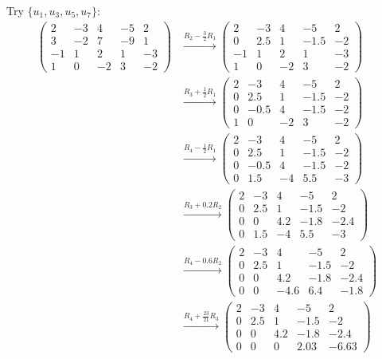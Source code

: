 \documentclass{article}
\begin{document}
Try $\{u_1, u_3, u_5, u_7\}$:
\begin{align*}
\begin{pmatrix}
2 & -3 & 4 & -5 & 2 \\
3 & -2 & 7 & -9 & 1 \\
-1 & 1 & 2 & 1 & -3 \\
1 & 0 & -2 & 3 & -2
\end{pmatrix}
&\xrightarrow{R_2 - \frac{3}{2}R_1}
\begin{pmatrix}
2 & -3 & 4 & -5 & 2 \\
0 & 2.5 & 1 & -1.5 & -2 \\
-1 & 1 & 2 & 1 & -3 \\
1 & 0 & -2 & 3 & -2
\end{pmatrix} \\
&\xrightarrow{R_3 + \frac{1}{2}R_1}
\begin{pmatrix}
2 & -3 & 4 & -5 & 2 \\
0 & 2.5 & 1 & -1.5 & -2 \\
0 & -0.5 & 4 & -1.5 & -2 \\
1 & 0 & -2 & 3 & -2
\end{pmatrix} \\
&\xrightarrow{R_4 - \frac{1}{2}R_1}
\begin{pmatrix}
2 & -3 & 4 & -5 & 2 \\
0 & 2.5 & 1 & -1.5 & -2 \\
0 & -0.5 & 4 & -1.5 & -2 \\
0 & 1.5 & -4 & 5.5 & -3
\end{pmatrix} \\
&\xrightarrow{R_3 + 0.2R_2}
\begin{pmatrix}
2 & -3 & 4 & -5 & 2 \\
0 & 2.5 & 1 & -1.5 & -2 \\
0 & 0 & 4.2 & -1.8 & -2.4 \\
0 & 1.5 & -4 & 5.5 & -3
\end{pmatrix} \\
&\xrightarrow{R_4 - 0.6R_2}
\begin{pmatrix}
2 & -3 & 4 & -5 & 2 \\
0 & 2.5 & 1 & -1.5 & -2 \\
0 & 0 & 4.2 & -1.8 & -2.4 \\
0 & 0 & -4.6 & 6.4 & -1.8
\end{pmatrix} \\
&\xrightarrow{R_4 + \frac{23}{21}R_3}
\begin{pmatrix}
2 & -3 & 4 & -5 & 2 \\
0 & 2.5 & 1 & -1.5 & -2 \\
0 & 0 & 4.2 & -1.8 & -2.4 \\
0 & 0 & 0 & 2.03 & -6.63
\end{pmatrix}
\end{align*}
\end{document}
